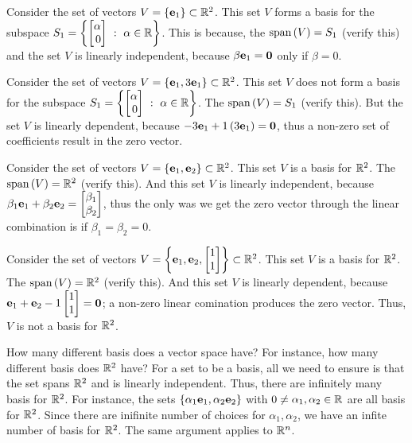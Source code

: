 \begin{boxedstuff}
    \begin{example}
        Consider the set of vectors $V = \left\{ \mathbf{e}_1 \right\} \subset \mathbb{R}^2$. This set $V$ forms a basis for the subspace $S_1 = \lc \bmx \alpha \\ 0\emx \,\, : \,\, \alpha \in \mb{R} \rc$. This is because, the $\text{span}\left( V\right) = S_1$ (verify this) and the set $V$ is linearly independent, because $\beta \mathbf{e}_1 = \mathbf{0}$ only if $\beta = 0$.
    \end{example}

    \begin{example}
        Consider the set of vectors $V = \left\{ \mathbf{e}_1, 3\mathbf{e}_1\right\} \subset \mathbb{R}^2$. This set $V$ does not form a basis for the subspace $S_1 = \lc \bmx \alpha \\ 0\emx \,\, : \,\, \alpha \in \mb{R} \rc$. The $\text{span}\left( V\right) = S_1$ (verify this). But the set $V$ is linearly dependent, because $-3 \mathbf{e}_1 + 1\left( 3\mathbf{e}_1\right) = \mathbf{0}$, thus a non-zero set of coefficients result in the zero vector.
    \end{example}

    \begin{example}
        Consider the set of vectors $V = \left\{ \mathbf{e}_1, \mathbf{e}_2\right\} \subset \mathbb{R}^2$. This set $V$ is a basis for $\mathbb{R}^2$. The $\text{span}\left( V\right) = \mathbb{R}^2$ (verify this). And this set $V$ is linearly independent, because $\beta_1 \mf{e}_1 + \beta_2\mf{e}_2 = \bmxc \beta_1 \\ \beta_2 \emx$, thus the only was we get the zero vector through the linear combination is if $\beta_1 = \beta_2 = 0$.
    \end{example}

    \begin{example}
        Consider the set of vectors $V = \lc \mf{e}_1, \mf{e}_2, \bmxc 1 \\ 1\emx\rc \subset \mb{R}^2$. This set $V$ is a basis for $\mathbb{R}^2$. The $\text{span}\left( V\right) = \mathbb{R}^2$ (verify this). And this set $V$ is linearly dependent, because $\mf{e}_1 + \mf{e}_2 - 1 \bmx 1 \\ 1\emx = \mf{0}$; a non-zero linear comination produces the zero vector. Thus, $V$ is not a basis for $\mathbb{R}^2$. 
    \end{example}
\end{boxedstuff}

How many different basis does a vector space have? For instance, how many different basis does $\mathbb{R}^2$ have? For a set to be a basis, all we need to ensure is that the set spans $\mathbb{R}^2$ and is linearly independent. Thus, there are infinitely many basis for $\mathbb{R}^2$. For instance, the sets $\left\{ \alpha_1\mathbf{e}_1, \alpha_2\mathbf{e}_2 \right\}$ with $0 \neq \alpha_1, \alpha_2 \in \mathbb{R}$ are all basis for $\mathbb{R}^2$. Since there are inifinite number of choices for $\alpha_1, \alpha_2$, we have an infite number of basis for $\mathbb{R}^2$. The same argument applies to $\mathbb{R}^n$.

